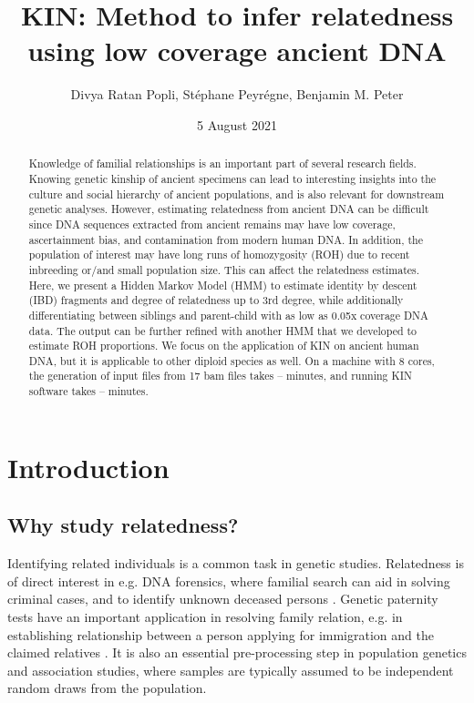\documentclass[12pt, letterpaper]{article}
\title{KIN: Method to infer relatedness using low coverage ancient DNA}
\author{Divya Ratan Popli, Stéphane Peyrégne, Benjamin M. Peter}
\date{5 August 2021}
\begin{document}
\nolinenumbers

\maketitle

\begin{abstract}

\noindent Knowledge of familial relationships is an important part of several research fields. Knowing genetic kinship of ancient specimens can lead to interesting insights into the culture and social hierarchy of ancient populations, and is also relevant for downstream genetic analyses. However, estimating relatedness from ancient DNA can be difficult since DNA sequences extracted from ancient remains may have low coverage, ascertainment bias, and contamination from modern human DNA. In addition, the population of interest may have long runs of homozygosity (ROH) due to recent inbreeding or/and small population size. This can affect the relatedness estimates. Here, we present a Hidden Markov Model (HMM) to estimate identity by descent (IBD) fragments and degree of relatedness up to 3rd degree, while additionally differentiating between siblings and parent-child with as low as 0.05x coverage DNA data. The output can be further refined with another HMM that we developed to estimate ROH proportions. We focus on the application of KIN on ancient human DNA, but it is applicable to other diploid species as well. On a machine with 8 cores, the generation of input files from 17 bam files takes -- minutes, and running KIN software takes -- minutes.
\end{abstract}

\section{Introduction}

\subsection{Why study relatedness?}

Identifying related individuals is a common task in genetic studies. Relatedness is of direct interest in e.g. DNA forensics, where familial search can aid in solving criminal cases, and to identify unknown deceased persons \cite{murphy_law_2018,ram_genealogy_2018}. Genetic paternity tests have an important application in resolving family relation, e.g. in establishing relationship between a person applying for immigration and the claimed relatives \cite{egeland_beyond_2000}. It is also an essential pre-processing step in population genetics and association studies, where samples are typically assumed to be independent random draws from the population.
\end{document}
